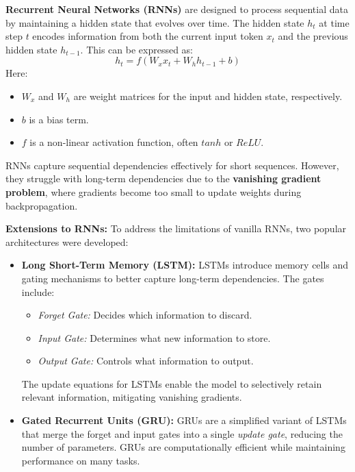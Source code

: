 \begin{flushleft}
    \large \textbf{Recurrent Neural Networks (RNNs)} are designed to process sequential data by maintaining a hidden state that evolves over time. The hidden state \(h_t\) at time step \(t\) encodes information from both the current input token \(x_t\) and the previous hidden state \(h_{t-1}\). This can be expressed as:
    \[
    h_t = f(W_x x_t + W_h h_{t-1} + b)
    \]
    Here:
    \begin{itemize}
        \item \(W_x\) and \(W_h\) are weight matrices for the input and hidden state, respectively.
        \item \(b\) is a bias term.
        \item \(f\) is a non-linear activation function, often \(tanh\) or \(ReLU\).
    \end{itemize}

    RNNs capture sequential dependencies effectively for short sequences. However, they struggle with long-term dependencies due to the \textbf{vanishing gradient problem}, where gradients become too small to update weights during backpropagation. \break

    \textbf{Extensions to RNNs:}
    To address the limitations of vanilla RNNs, two popular architectures were developed:
    \begin{itemize}
        \item \textbf{Long Short-Term Memory (LSTM):} LSTMs introduce memory cells and gating mechanisms to better capture long-term dependencies. The gates include:
        \begin{itemize}
            \item \textit{Forget Gate:} Decides which information to discard.
            \item \textit{Input Gate:} Determines what new information to store.
            \item \textit{Output Gate:} Controls what information to output.
        \end{itemize}
        The update equations for LSTMs enable the model to selectively retain relevant information, mitigating vanishing gradients.
        
        \item \textbf{Gated Recurrent Units (GRU):} GRUs are a simplified variant of LSTMs that merge the forget and input gates into a single \textit{update gate}, reducing the number of parameters. GRUs are computationally efficient while maintaining performance on many tasks.
    \end{itemize}


\end{flushleft}
